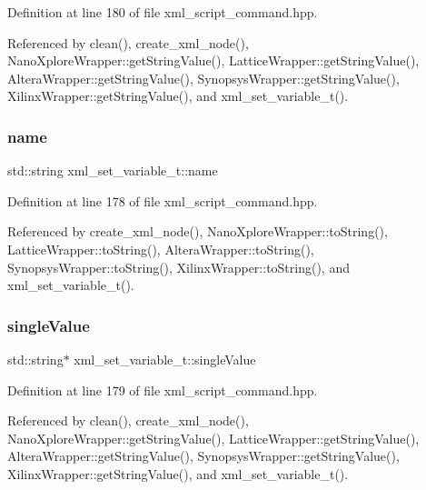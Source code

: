 Definition at line 180 of file xml\+\_\+script\+\_\+command.\+hpp.



Referenced by clean(), create\+\_\+xml\+\_\+node(), Nano\+Xplore\+Wrapper\+::get\+String\+Value(), Lattice\+Wrapper\+::get\+String\+Value(), Altera\+Wrapper\+::get\+String\+Value(), Synopsys\+Wrapper\+::get\+String\+Value(), Xilinx\+Wrapper\+::get\+String\+Value(), and xml\+\_\+set\+\_\+variable\+\_\+t().

\mbox{\label{classxml__set__variable__t_a5fecba6d9ebea723a3deb6e7910077d1}} 
\subsubsection{\texorpdfstring{name}{name}}
{\footnotesize\ttfamily std\+::string xml\+\_\+set\+\_\+variable\+\_\+t\+::name}



Definition at line 178 of file xml\+\_\+script\+\_\+command.\+hpp.



Referenced by create\+\_\+xml\+\_\+node(), Nano\+Xplore\+Wrapper\+::to\+String(), Lattice\+Wrapper\+::to\+String(), Altera\+Wrapper\+::to\+String(), Synopsys\+Wrapper\+::to\+String(), Xilinx\+Wrapper\+::to\+String(), and xml\+\_\+set\+\_\+variable\+\_\+t().

\mbox{\label{classxml__set__variable__t_a06c35d7c0c7beadfa65b51b55aed74ab}} 
\subsubsection{\texorpdfstring{single\+Value}{singleValue}}
{\footnotesize\ttfamily std\+::string$\ast$ xml\+\_\+set\+\_\+variable\+\_\+t\+::single\+Value}



Definition at line 179 of file xml\+\_\+script\+\_\+command.\+hpp.



Referenced by clean(), create\+\_\+xml\+\_\+node(), Nano\+Xplore\+Wrapper\+::get\+String\+Value(), Lattice\+Wrapper\+::get\+String\+Value(), Altera\+Wrapper\+::get\+String\+Value(), Synopsys\+Wrapper\+::get\+String\+Value(), Xilinx\+Wrapper\+::get\+String\+Value(), and xml\+\_\+set\+\_\+variable\+\_\+t().



